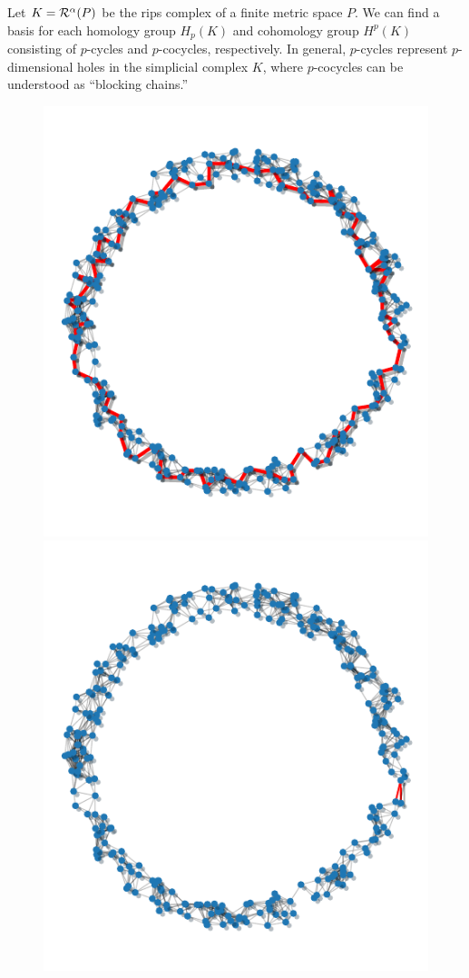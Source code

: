 Let $K = \mathcal{R}^\alpha(P)$ be the rips complex of a finite metric space $P$.
We can find a basis for each homology group $H_p(K)$ and cohomology group $H^p(K)$ consisting of $p$-cycles and $p$-cocycles, respectively.
In general, $p$-cycles represent $p$-dimensional holes in the simplicial complex $K$, where $p$-cocycles can be understood as ``blocking chains.''

\begin{figure}[htbp]
\centering
    \includegraphics[scale=1.]{figures/homology_cycle.pdf}
    \includegraphics[scale=1.]{figures/cohomology_cocycle.pdf}

\end{figure}
